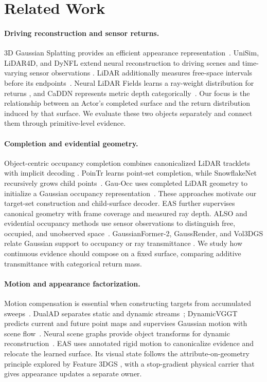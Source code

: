\section{Related Work}

\paragraph{Driving reconstruction and sensor returns.}
3D Gaussian Splatting provides an efficient appearance representation~\cite{kerbl2023gaussians}.
UniSim, LiDAR4D, and DyNFL extend neural reconstruction to driving scenes and time-varying sensor observations
\cite{yang2023unisim,zheng2024lidar4d,wu2024dynfl}. LiDAR additionally measures free-space intervals before
its endpoints~\cite{hu2020visibility}. Neural LiDAR Fields learns a ray-weight distribution for returns
\cite{huang2023nlf}, and CaDDN represents metric depth categorically~\cite{reading2021caddn}.
Our focus is the relationship between an Actor's completed surface and the return distribution induced by
that surface. We evaluate these two objects separately and connect them through primitive-level evidence.

\paragraph{Completion and evidential geometry.}
Object-centric occupancy completion combines canonicalized LiDAR tracklets with implicit decoding
\cite{zheng2024objectcentric}. PoinTr learns point-set completion, while SnowflakeNet recursively grows
child points~\cite{yu2021pointr,xiang2021snowflakenet}. Gau-Occ uses completed LiDAR geometry to initialize
a Gaussian occupancy representation~\cite{lv2026gauocc}. These approaches motivate our target-set construction
and child-surface decoder. EAS further supervises canonical geometry with frame coverage and measured ray depth.
ALSO and evidential occupancy methods use sensor observations to distinguish free, occupied, and unobserved
space~\cite{boulch2023also,kalble2024accurate,kalble2025evocc}. GaussianFormer-2, GaussRender, and Vol3DGS
relate Gaussian support to occupancy or ray transmittance
\cite{huang2025gaussianformer2,chambon2025gaussrender,talegaonkar2025vol3dgs}.
We study how continuous evidence should compose on a fixed surface, comparing additive transmittance with
categorical return mass.

\paragraph{Motion and appearance factorization.}
Motion compensation is essential when constructing targets from accumulated sweeps~\cite{xia2023scpnet}.
DualAD separates static and dynamic streams~\cite{doll2024dualad}; DynamicVGGT predicts current and future
point maps and supervises Gaussian motion with scene flow~\cite{he2026dynamicvggt}.
Neural scene graphs provide object transforms for dynamic reconstruction~\cite{ost2021neural}.
EAS uses annotated rigid motion to canonicalize evidence and relocate the learned surface.
Its visual state follows the attribute-on-geometry principle explored by Feature 3DGS
\cite{zhou2024feature3dgs}, with a stop-gradient physical carrier that gives appearance updates a separate owner.
